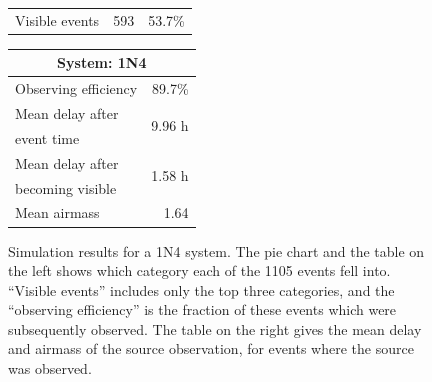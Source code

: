 \begin{colsection}
\begin{colsection}
\begin{figure}[p]
\begin{center}
\begin{minipage}[t]{0.45\textwidth}
\begin{tabular}{lrr}
                \midrule
                Visible events & 593 &  53.7\% \\
            \end{tabular}
        \end{minipage}
        \begin{minipage}[t]{0.37\textwidth}\vspace{0pt}
            \begin{tabular}{lr}
                \multicolumn{2}{c}{\textbf{System: 1N4}} \\
                \midrule
                Observing efficiency & 89.7\% \\
                \midrule
                Mean delay after     & \multirow{2}{*}{9.96 h} \\
                event time           & \\
                Mean delay after     & \multirow{2}{*}{1.58 h} \\
                becoming visible     & \\
                \midrule
                Mean airmass         & 1.64 \\
            \end{tabular}
        \end{minipage}
    \end{center}
    \caption[GW simulation results: 1N4 system]{
        Simulation results for a 1N4 system. The pie chart and the table on the left shows which category each of the 1105 events fell into. ``Visible events'' includes only the top three categories, and the ``observing efficiency'' is the fraction of these events which were subsequently observed. The table on the right gives the mean delay and airmass of the source observation, for events where the source was observed.
    }\label{fig:gw_sim_1n4}
\end{figure}


\end{colsection}
\end{colsection}
